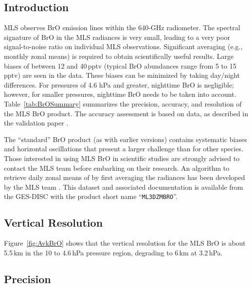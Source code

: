 \subsection{Introduction}

MLS observes BrO emission lines within the \mbox{640-GHz} radiometer. The spectral signature of BrO in the MLS radiances is very small, leading to a very poor signal-to-noise ratio on individual MLS observations. Significant averaging (e.g., monthly zonal means) is required to obtain scientifically useful results. Large biases of between 12 and 40\,pptv (typical BrO abundances range from 5 to 15\,pptv) are seen in the data. These biases can be minimized by taking day/night differences. For pressures of 4.6 hPa and greater, nighttime BrO is negligible; however, for smaller pressures, nighttime BrO needs to be taken into account. Table~\ref{tab:BrOSummary} summarizes the precision, accuracy, and resolution of the MLS \thisv BrO product. The accuracy assessment is based on \vii data, as described in the validation paper \citep{KovalenkoEtal:2007:BrO}.

The \thisv ``standard'' BrO product (as with earlier versions) contains systematic biases and horizontal oscillations that present a larger challenge than for other species. Those interested in using MLS BrO in scientific studies are strongly advised to contact the MLS team before embarking on their research. 
An algorithm to retrieve daily zonal means of  by first averaging the radiances has been developed by the MLS team \citep{MillanEtal:2012}. This dataset and associated documentation is available from the GES-DISC with the product short name ``\texttt{ML3DZMBRO}''.

\subsection{Vertical Resolution}

Figure~\ref{fig:AvkBrO} shows that the vertical resolution for the \thisv MLS BrO is about 5.5\,km in the 10 to 4.6\,hPa pressure region, degrading to 6\,km at 3.2\,hPa.

\subsection{Precision}

